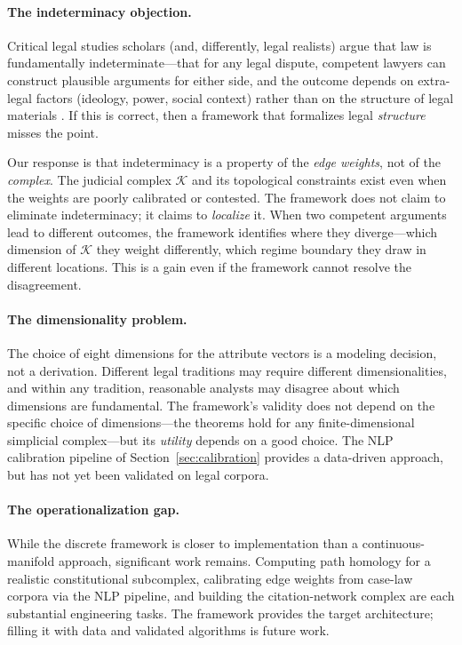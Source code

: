 \documentclass[12pt]{article}
\theoremstyle{definition}
\theoremstyle{remark}
\begin{document}
\paragraph{The indeterminacy objection.}
Critical legal studies scholars (and, differently, legal realists) argue that law is fundamentally indeterminate---that for any legal dispute, competent lawyers can construct plausible arguments for either side, and the outcome depends on extra-legal factors (ideology, power, social context) rather than on the structure of legal materials \cite{kennedy1986}.  If this is correct, then a framework that formalizes legal \emph{structure} misses the point.

Our response is that indeterminacy is a property of the \emph{edge weights}, not of the \emph{complex}.  The judicial complex $\mathcal{K}$ and its topological constraints exist even when the weights are poorly calibrated or contested.  The framework does not claim to eliminate indeterminacy; it claims to \emph{localize} it.  When two competent arguments lead to different outcomes, the framework identifies where they diverge---which dimension of $\mathcal{K}$ they weight differently, which regime boundary they draw in different locations.  This is a gain even if the framework cannot resolve the disagreement.

\paragraph{The dimensionality problem.}
The choice of eight dimensions for the attribute vectors is a modeling decision, not a derivation.  Different legal traditions may require different dimensionalities, and within any tradition, reasonable analysts may disagree about which dimensions are fundamental.  The framework's validity does not depend on the specific choice of dimensions---the theorems hold for any finite-dimensional simplicial complex---but its \emph{utility} depends on a good choice.  The NLP calibration pipeline of Section~\ref{sec:calibration} provides a data-driven approach, but has not yet been validated on legal corpora.

\paragraph{The operationalization gap.}
While the discrete framework is closer to implementation than a continuous-manifold approach, significant work remains.  Computing path homology for a realistic constitutional subcomplex, calibrating edge weights from case-law corpora via the NLP pipeline, and building the citation-network complex are each substantial engineering tasks.  The framework provides the target architecture; filling it with data and validated algorithms is future work.
\end{document}
